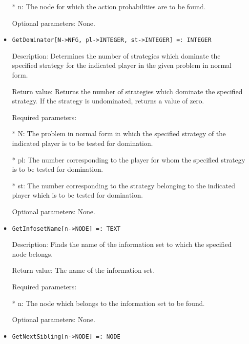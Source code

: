 \begin{itemize}
\bd
\item
[* n:] The node for which the action probabilities are to be found.
\ed

\item
[Optional parameters:] None.
\ed

\item
\begin{verbatim}
GetDominator[N->NFG, pl->INTEGER, st->INTEGER] =: INTEGER
\end{verbatim}

\bd
\item
[Description:] Determines the number of strategies which dominate the
specified strategy for the indicated player in the given problem in 
normal form.
\item
[Return value:] Returns the number of strategies which dominate the
specified strategy.  If the strategy is undominated, returns a value
of zero.  
\item
[Required parameters:]\hfil\null

\bd
\item
[* N:] The problem in normal form in which the specified strategy of
the indicated player is to be tested for domination.
\item
[* pl:] The number corresponding to the player for whom the specified
strategy is to be tested for domination.
\item
[* st:] The number corresponding to the strategy belonging to the 
indicated player which is to be tested for domination.
\ed

\item
[Optional parameters:] None.
\ed

\item
\begin{verbatim}
GetInfosetName[n->NODE] =: TEXT
\end{verbatim}

\bd
\item
[Description:] Finds the name of the information set to which the 
specified node belongs.
\item
[Return value:] The name of the information set.
\item
[Required parameters:]\hfil\null

\bd
\item
[* n:] The node which belongs to the information set to be found.
\ed

\item
[Optional parameters:] None.
\ed

\item
\begin{verbatim}
GetNextSibling[n->NODE] =: NODE
\end{verbatim}


\end{itemize}
